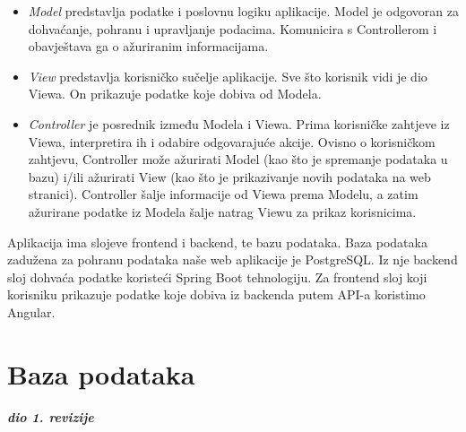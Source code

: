 		\begin{itemize}
			\item \textit{Model} predstavlja podatke i poslovnu logiku aplikacije. Model je odgovoran za dohvaćanje, pohranu i upravljanje podacima. Komunicira s Controllerom i obavještava ga o ažuriranim informacijama.
			
			\item \textit{View} predstavlja korisničko sučelje aplikacije. Sve što korisnik vidi je dio Viewa. On prikazuje podatke koje dobiva od Modela.
			
			\item \textit{Controller} je posrednik između Modela i Viewa. Prima korisničke zahtjeve iz Viewa, interpretira ih i odabire odgovarajuće akcije. Ovisno o korisničkom zahtjevu, Controller može ažurirati Model (kao što je spremanje podataka u bazu) i/ili ažurirati View (kao što je prikazivanje novih podataka na web stranici). Controller šalje informacije od Viewa prema Modelu, a zatim ažurirane podatke iz Modela šalje natrag Viewu za prikaz korisnicima.
		\end{itemize}
		
		 
		Aplikacija ima slojeve frontend i backend, te bazu podataka. Baza podataka zadužena za pohranu podataka naše web aplikacije je PostgreSQL. Iz nje backend sloj dohvaća podatke koristeći Spring Boot tehnologiju. Za frontend sloj koji korisniku prikazuje podatke koje dobiva iz backenda putem API-a koristimo Angular.
		

		

				
		\section{Baza podataka}
			
			\textbf{\textit{dio 1. revizije}}\\
			
